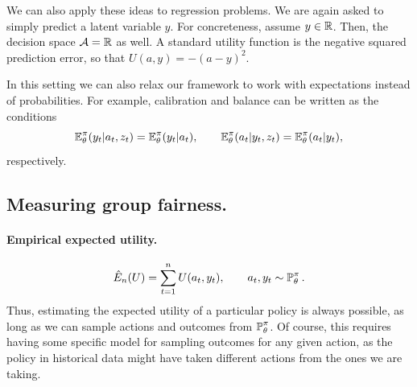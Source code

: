 \begin{example}[Regression]
  We can also apply these ideas to regression problems. We are again
  asked to simply predict a latent variable $y$. For concreteness,
  assume $y \in {\mathbb{R}}$. Then, the decision space ${\mathcal{A}} = {\mathbb{R}}$ as
  well. A standard utility function is the negative squared prediction
  error, so that $U(a, y) = - (a - y)^2$.

  In this setting we can also relax our framework to work with
  expectations instead of probabilities. For example, calibration and balance can be written as the conditions
  \[
    \mathop{\mbox{\ensuremath{\mathbb{E}}}}\nolimits_\theta^\pi(y_t | a_t, z_t) = \mathop{\mbox{\ensuremath{\mathbb{E}}}}\nolimits_\theta^\pi(y_t | a_t),
    \qquad
    \mathop{\mbox{\ensuremath{\mathbb{E}}}}\nolimits_\theta^\pi(a_t | y_t, z_t) = \mathop{\mbox{\ensuremath{\mathbb{E}}}}\nolimits_\theta^\pi(a_t | y_t),
  \]
  respectively.
\end{example}

\subsection{Measuring group fairness.}



\paragraph{Empirical expected utility.}
\[
  \hat{E}_n(U) = \sum_{t=1}^n U(a_t,y_t), \qquad a_t, y_t \sim \mathop{\mbox{\ensuremath{\mathbb{P}}}}\nolimits_\theta^\pi.
\]
Thus, estimating the expected utility of a particular policy is always possible, as long as we can sample actions and outcomes from $\mathop{\mbox{\ensuremath{\mathbb{P}}}}\nolimits_\theta^\pi$. Of course, this requires having some specific model for sampling outcomes for any given action, as the policy in historical data might have taken different actions from the ones we are taking.

